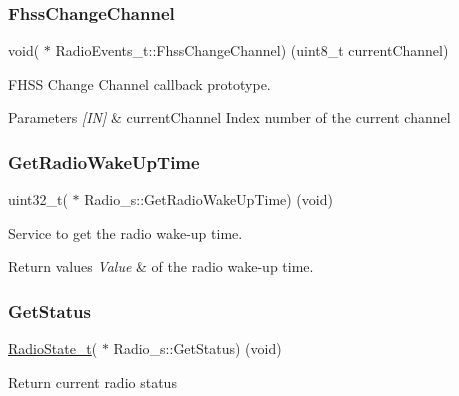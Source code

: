 \subsubsection{\texorpdfstring{Fhss\+Change\+Channel}{FhssChangeChannel}}
{\footnotesize\ttfamily void( $\ast$ Radio\+Events\+\_\+t\+::\+Fhss\+Change\+Channel) (uint8\+\_\+t current\+Channel)}



F\+H\+SS Change Channel callback prototype. 


\begin{DoxyParams}{Parameters}
{\em \mbox{[}\+I\+N\mbox{]}} & current\+Channel Index number of the current channel \\
\hline
\end{DoxyParams}
\mbox{\label{group__LORA_ga7396df7c609fbda8b6ed87755b3899be}} 
\subsubsection{\texorpdfstring{Get\+Radio\+Wake\+Up\+Time}{GetRadioWakeUpTime}}
{\footnotesize\ttfamily uint32\+\_\+t( $\ast$ Radio\+\_\+s\+::\+Get\+Radio\+Wake\+Up\+Time) (void)}



Service to get the radio wake-\/up time. 


\begin{DoxyRetVals}{Return values}
{\em Value} & of the radio wake-\/up time. \\
\hline
\end{DoxyRetVals}
\mbox{\label{group__LORA_ga24c01d8388f399e8ccaea190048eea9d}} 
\subsubsection{\texorpdfstring{Get\+Status}{GetStatus}}
{\footnotesize\ttfamily \hyperlink{group__LORA_ga2f3fa4ad0237c4ace94aa99086aac9f5}{Radio\+State\+\_\+t}( $\ast$ Radio\+\_\+s\+::\+Get\+Status) (void)}

Return current radio status


